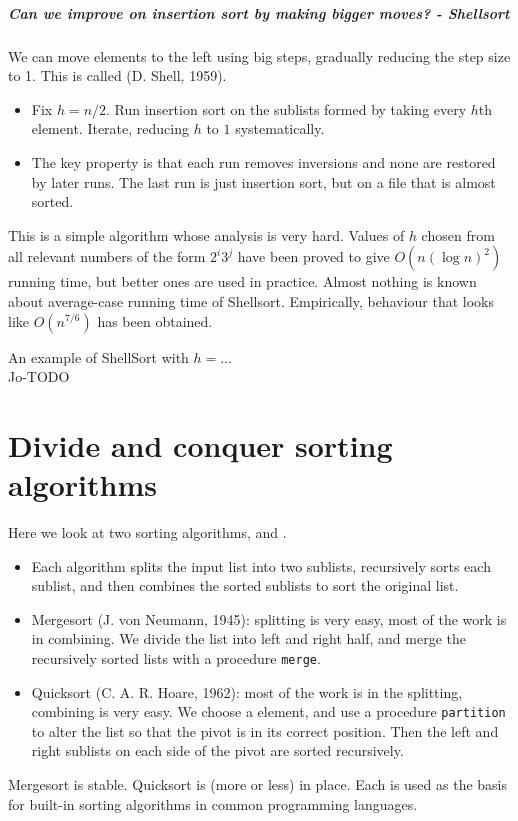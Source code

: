 \paragraph{Can we improve on insertion sort by making bigger moves? - Shellsort}
We can move elements to the left using big steps, gradually reducing the 
step size to 1. This is called  (D. Shell, 1959). 
\begin{itemize}
\item Fix $h = n/2$. Run insertion sort on the sublists formed by taking 
every $h$th element. Iterate, reducing $h$ to $1$ systematically. 
\item The key property is that each run removes inversions and none are 
restored by later runs. The last run is just insertion sort, but on a file that 
is almost sorted.
\end{itemize}
This is a simple algorithm whose analysis is very hard. 
Values of $h$ chosen from all relevant numbers of the form $2^i 3^j$ have been proved to give 
$O(n (\log n)^2)$ running time, but better ones are used in practice. 
Almost nothing is known about average-case running time of Shellsort. 
Empirically, behaviour that looks like $O(n^{7/6})$ has been obtained.

\begin{Example}
An example of ShellSort with $h = \ldots$\\
Jo-TODO
\end{Example}


\chapter{Divide and conquer sorting algorithms}  %
Here we look at two sorting algorithms,  and .
\begin{itemize}
\item Each algorithm splits the input list into two sublists, 
recursively sorts each sublist, and then combines the sorted sublists to sort 
the original list.
\item Mergesort (J. von Neumann, 1945): splitting is very easy, most 
of the work is in combining. 
We divide the list into left and right half, and merge the recursively sorted 
lists with a procedure \texttt{merge}. 
\item Quicksort (C. A. R. Hoare, 1962): most of the work is in the 
splitting, combining is very easy. We choose a  element, and use a 
procedure \texttt{partition} to alter the list so that the pivot is in its 
correct position. Then the left and right sublists on each side of the pivot 
are sorted recursively.
\end{itemize}
Mergesort is stable. Quicksort is (more or less) in place. Each is used as the basis for 
built-in sorting algorithms in common programming languages.


